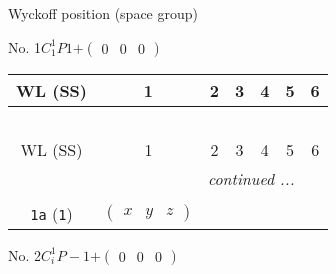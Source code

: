 \documentclass[fleqn,9pt,landscape]{jsarticle}
\begin{document}
\setcounter{MaxMatrixCols}{16}

\begin{center}
\LARGE
Wyckoff position (space group)
\end{center}
No. 1\quad$C_{1}^{1}$\quad$P1$\quad[ triclinic ]\quad$+\begin{pmatrix} 0 & 0 & 0 \end{pmatrix}$
\begin{center}
\renewcommand{\arraystretch}{1.2}
\begin{longtable}{ccccccc}
 \hline \hline
WL (SS) & 1 & 2 & 3 & 4 & 5 & 6 \\ \hline \endfirsthead

\multicolumn{6}{l}{\tablename\ \thetable{}} \\
 \hline \hline
WL (SS) & 1 & 2 & 3 & 4 & 5 & 6 \\ \hline \endhead

 \hline \hline
\multicolumn{6}{r}{\footnotesize\it continued ...} \\ \endfoot

 \hline \hline
\multicolumn{6}{r}{} \\ \endlastfoot

{\tt 1a} ({\tt 1}) & $ \begin{pmatrix} x & y & z \end{pmatrix} $ \\
\end{longtable}
\end{center}
\newpage
No. 2\quad$C_{i}^{1}$\quad$P-1$\quad[ triclinic ]\quad$+\begin{pmatrix} 0 & 0 & 0 \end{pmatrix}$
\end{document}
